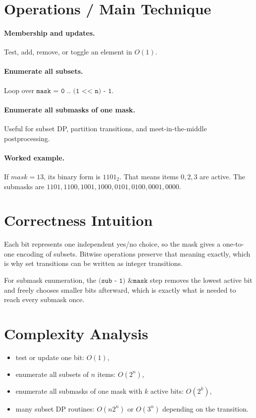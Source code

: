 \section*{Operations / Main Technique}

\paragraph{Membership and updates.}
Test, add, remove, or toggle an element in \(O(1)\).

\paragraph{Enumerate all subsets.}
Loop over \(\texttt{mask = 0 .. (1 << n) - 1}\).

\paragraph{Enumerate all submasks of one mask.}
Useful for subset DP, partition transitions, and meet-in-the-middle postprocessing.

\paragraph{Worked example.}
If \(mask = 13\), its binary form is \(1101_2\). That means items \(0, 2, 3\) are active. The submasks are
\(1101, 1100, 1001, 1000, 0101, 0100, 0001, 0000\).

\section*{Correctness Intuition}

Each bit represents one independent yes/no choice, so the mask gives a one-to-one encoding of subsets. Bitwise
operations preserve that meaning exactly, which is why set transitions can be written as integer transitions.

For submask enumeration, the \(\texttt{(sub - 1) \& mask}\) step removes the lowest active bit and freely chooses
smaller bits afterward, which is exactly what is needed to reach every submask once.

\section*{Complexity Analysis}

\begin{itemize}
  \item test or update one bit: \(O(1)\),
  \item enumerate all subsets of \(n\) items: \(O(2^n)\),
  \item enumerate all submasks of one mask with \(k\) active bits: \(O(2^k)\),
  \item many subset DP routines: \(O(n 2^n)\) or \(O(3^n)\) depending on the transition.
\end{itemize}

